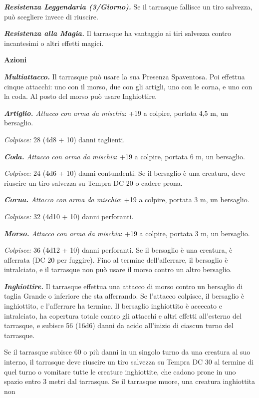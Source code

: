 \begin{multicols}{2}
\emph{\textbf{Resistenza Leggendaria (3/Giorno).}} Se il tarrasque
fallisce un tiro salvezza, può scegliere invece di riuscire.

\emph{\textbf{Resistenza alla Magia.}} Il tarrasque ha vantaggio ai tiri
salvezza contro incantesimi o altri effetti magici.


\smallskip\textbf{Azioni}

\emph{\textbf{Multiattacco.}} Il tarrasque può usare la sua Presenza
Spaventosa. Poi effettua cinque attacchi: uno con il morso, due con gli
artigli, uno con le corna, e uno con la coda. Al posto del morso può
usare Inghiottire.

\emph{\textbf{Artiglio.} Attacco con arma da mischia}: +19 a colpire,
portata 4,5 m, un bersaglio.

\emph{Colpisce:} 28 (4d8 + 10) danni taglienti.

\emph{\textbf{Coda.} Attacco con arma da mischia}: +19 a colpire,
portata 6 m, un bersaglio.

\emph{Colpisce:} 24 (4d6 + 10) danni contundenti. Se il bersaglio è una
creatura, deve riuscire un tiro salvezza su Tempra DC 20 o cadere prona.

\emph{\textbf{Corna.} Attacco con arma da mischia}: +19 a colpire,
portata 3 m, un bersaglio.

\emph{Colpisce:} 32 (4d10 + 10) danni perforanti.

\emph{\textbf{Morso.} Attacco con arma da mischia}: +19 a colpire,
portata 3 m, un bersaglio.

\emph{Colpisce:} 36 (4d12 + 10) danni perforanti. Se il bersaglio è una
creatura, è afferrata (DC 20 per fuggire). Fino al termine
dell'afferrare, il bersaglio è intralciato, e il tarrasque non può usare
il morso contro un altro bersaglio.

\emph{\textbf{Inghiottire.}} Il tarrasque effettua una attacco di morso
contro un bersaglio di taglia Grande o inferiore che sta afferrando. Se
l'attacco colpisce, il bersaglio è inghiottito, e l'afferrare ha
termine. Il bersaglio inghiottito è accecato e intralciato, ha copertura
totale contro gli attacchi e altri effetti all'esterno del tarrasque, e
subisce 56 (16d6) danni da acido all'inizio di ciascun turno del
tarrasque.

Se il tarrasque subisce 60 o più danni in un singolo turno da una
creatura al suo interno, il tarrasque deve riuscire un tiro salvezza su Tempra DC 30 al termine di quel turno o vomitare tutte le creature
inghiottite, che cadono prone in uno spazio entro 3 metri dal tarrasque.
Se il tarrasque muore, una creatura inghiottita non



\end{multicols}

